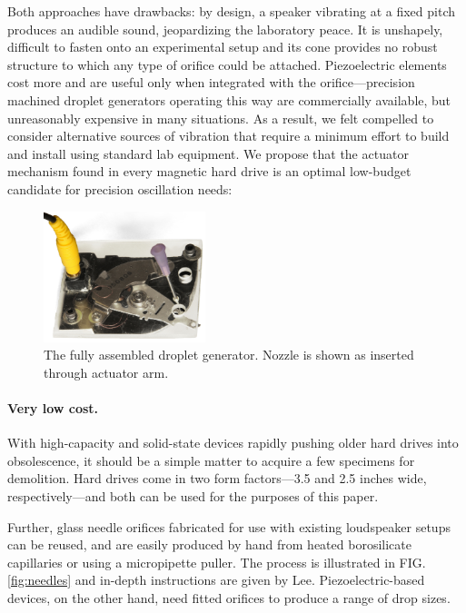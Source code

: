 \documentclass[aip,rsi,reprint,graphicx]{revtex4-1} %
\begin{document}
Both approaches have drawbacks: by design, a speaker vibrating at a fixed pitch
produces an audible sound, jeopardizing the laboratory peace. It is unshapely,
difficult to fasten onto an experimental setup and its cone provides no robust
structure to which any type of orifice could be attached. Piezoelectric elements
cost more and are useful only when integrated with the orifice---precision
machined droplet generators operating this way are commercially available, but
unreasonably expensive in many situations. As a result, we felt compelled to
consider alternative sources of vibration that require a minimum effort to build
and install using standard lab equipment. We propose that the actuator mechanism
found in every magnetic hard drive is an optimal low-budget candidate for
precision oscillation needs:

\begin{figure}
\centering
\includegraphics[width=0.42\textwidth]{hdg_images/designpicture.jpg}
\caption{The fully assembled droplet generator. Nozzle is shown as inserted
through actuator arm. \label{fig:photo}}
\end{figure}

\paragraph*{Very low cost.} With high-capacity and solid-state devices rapidly pushing older hard drives
into obsolescence, it should be a simple matter to acquire a few specimens for
demolition. Hard drives come in two form factors---3.5 and 2.5 inches wide,
respectively---and both can be used for the purposes of this paper. 

Further, glass needle orifices fabricated for use with existing loudspeaker setups can be
reused, and are easily produced by hand from heated borosilicate capillaries or
using a micropipette puller. The process is illustrated in FIG.
\ref{fig:needles} and in-depth instructions are given by Lee\cite{Lee02}.
Piezoelectric-based devices, on the other hand, need fitted orifices to produce a range of
drop sizes.
\end{document}
